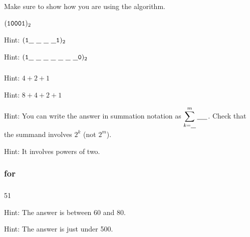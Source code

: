 \subsubsection*{ \answers}
Make sure to show how you are using the algorithm.
\begin{apart}
    \item $(\texttt{10001})_2$
    \item Hint: $(\texttt{1}\underline{\hspace{.1in}}~\underline{\hspace{.1in}}~\underline{\hspace{.1in}}~\underline{\hspace{.1in}}\texttt{1})_2$
    \item Hint: $(\texttt{1}\underline{\hspace{.1in}}~\underline{\hspace{.1in}}~\underline{\hspace{.1in}}~\underline{\hspace{.1in}}~\underline{\hspace{.1in}}~\underline{\hspace{.1in}}~\underline{\hspace{.1in}}\texttt{0})_2$
\end{apart}

\subsubsection*{ \answers}
\begin{apart}
    \item Hint: $4+2+1$
    \item Hint: $8+4+2+1$
    \item Hint: You can write the answer in summation notation as $\displaystyle \sum_{k=\underline{\hspace{.1in}}}^m\underline{\hspace{.2in}}$.  Check that the summand involves $2^k$ (not $2^m$).
    \item Hint: It involves powers of two.
\end{apart}

\subsubsection{\answers for  \subhex}

\subsubsection*{ \answers}
\begin{apart}
    \item 51
    \item Hint: The answer is between 60 and 80.
    \item Hint: The answer is just under 500.
\end{apart}

